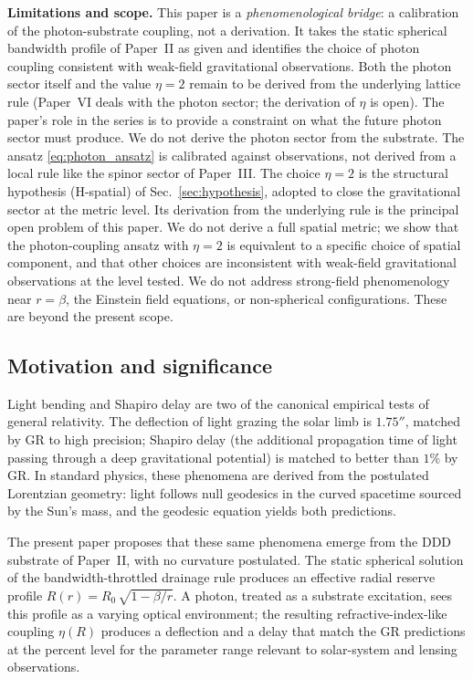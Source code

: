 \documentclass[11pt,a4paper]{article}
\begin{document}
\textbf{Limitations and scope.}
This paper is a \emph{phenomenological bridge}: a calibration of
the photon-substrate coupling, not a derivation. It takes the
static spherical bandwidth profile of Paper~II as given and
identifies the choice of photon coupling consistent with
weak-field gravitational observations. Both the photon sector
itself and the value $\eta = 2$ remain to be derived from the
underlying lattice rule (Paper~VI deals with the photon sector;
the derivation of $\eta$ is open). The paper's role in the
series is to provide a constraint on what the future photon
sector must produce.
We do not derive the photon sector from the substrate. The
ansatz \eqref{eq:photon_ansatz} is calibrated against
observations, not derived from a local rule like the spinor
sector of Paper~III. The choice $\eta = 2$ is the structural hypothesis
(H-spatial) of Sec.~\ref{sec:hypothesis}, adopted to close the
gravitational sector at the metric level. Its derivation from
the underlying rule is the principal open problem of this
paper. We do not derive a full
spatial metric; we show that the photon-coupling ansatz with
$\eta = 2$ is equivalent to a specific choice of spatial
component, and that other choices are inconsistent with weak-field
gravitational observations at the level tested. We do not address
strong-field phenomenology near $r = \beta$, the Einstein field
equations, or non-spherical configurations. These are beyond the
present scope.

\subsection*{Motivation and significance}

Light bending and Shapiro delay are two of the canonical empirical
tests of general relativity. The deflection of light grazing the
solar limb is $1.75''$, matched by GR to high precision; Shapiro
delay (the additional propagation time of light passing through a
deep gravitational potential) is matched to better than $1\%$ by GR.
In standard physics, these phenomena are derived from the
postulated Lorentzian geometry: light follows null geodesics in the
curved spacetime sourced by the Sun's mass, and the geodesic equation
yields both predictions.

The present paper proposes that these same phenomena emerge from the
DDD substrate of Paper~II, with no curvature postulated. The static
spherical solution of the bandwidth-throttled drainage rule produces
an effective radial reserve profile $R(r) = R_0\,\sqrt{1 - \beta/r}$.
A photon, treated as a substrate excitation, sees this profile as a
varying optical environment; the resulting refractive-index-like
coupling $\eta(R)$ produces a deflection and a delay that match the
GR predictions at the percent level for the parameter range relevant
to solar-system and lensing observations.
\end{document}
